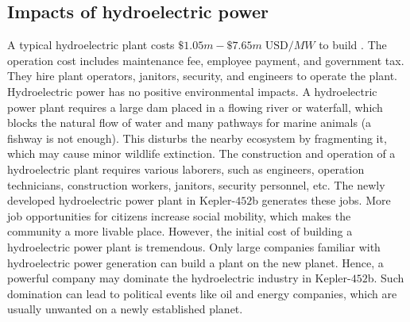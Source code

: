 \documentclass{article}
\begin{document}
\subsection{Impacts of hydroelectric power}
A typical hydroelectric plant costs $\$1.05m - \$7.65m \;\text{USD} / MW$ to build \cite{cite16}. The operation cost includes maintenance fee, employee payment, and government tax. They hire plant operators, janitors, security, and engineers to operate the plant. 
Hydroelectric power has no positive environmental impacts. A hydroelectric power plant requires a large dam placed in a flowing river or waterfall, which blocks the natural flow of water and many pathways for marine animals (a fishway is not enough). This disturbs the nearby ecosystem by fragmenting it, which may cause minor wildlife extinction.
The construction and operation of a hydroelectric plant requires various laborers, such as engineers, operation technicians, construction workers, janitors, security personnel, etc. The newly developed hydroelectric power plant in Kepler-$452$b generates these jobs. More job opportunities for citizens increase social mobility, which makes the community a more livable place. 
However, the initial cost of building a hydroelectric power plant is tremendous. Only large companies familiar with hydroelectric power generation can build a plant on the new planet. Hence, a powerful company may dominate the hydroelectric industry in Kepler-$452$b. Such domination can lead to political events like oil and energy companies, which are usually unwanted on a newly established planet. 
\end{document}
